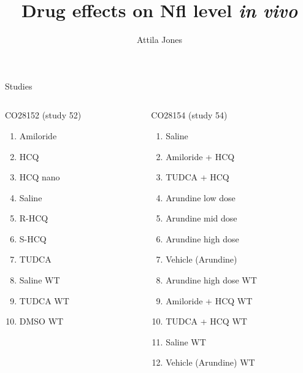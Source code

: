 \documentclass[aspectratio=169]{beamer}
\title{Drug effects on Nfl level \emph{in vivo}}
\subtitle{}
\author{Attila Jones}
\date{}
\begin{document}
\titlepage

\begin{frame}{Studies}
\begin{columns}[t]
\begin{column}{0.5\textwidth}
  CO28152 (study 52)
\begin{enumerate}
      \item Amiloride
      \item HCQ
      \item HCQ nano
      \item Saline
      \item R-HCQ
      \item S-HCQ
      \item TUDCA
      \item Saline WT
      \item TUDCA WT
      \item DMSO WT
\end{enumerate}
\end{column}
\begin{column}{0.5\textwidth}
  CO28154 (study 54)
\begin{enumerate}
  \item Saline
  \item Amiloride + HCQ
  \item TUDCA + HCQ
  \item Arundine low dose
  \item Arundine mid dose
  \item Arundine high dose
  \item Vehicle (Arundine)
  \item Arundine high dose WT
  \item Amiloride + HCQ WT
  \item TUDCA + HCQ WT
  \item Saline WT
  \item Vehicle (Arundine) WT
\end{enumerate}
\end{column}
\end{columns}
\end{frame}
\end{document}

